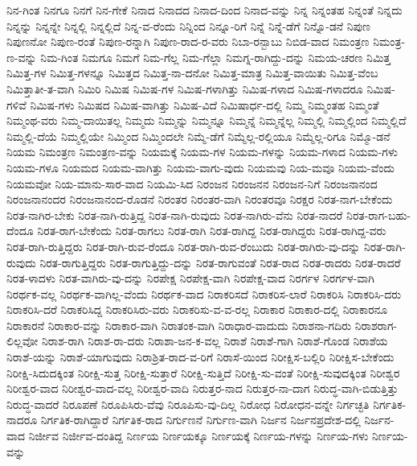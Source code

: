 {ನಿನ-ಗಿಂತ
ನಿನಗೂ
ನಿನಗೆ
ನಿನ-ಗೇಕೆ
ನಿನಾದ
ನಿನಾದದ
ನಿನಾದ-ದಿಂದ
ನಿನಾದ-ವನ್ನು
ನಿನ್ನ
ನಿನ್ನಂತಹ
ನಿನ್ನಂತೆ
ನಿನ್ನದು
ನಿನ್ನನ್ನು
ನಿನ್ನನ್ನೇ
ನಿನ್ನಲ್ಲಿ
ನಿನ್ನಲ್ಲಿದೆ
ನಿನ್ನ-ವ-ರೆಂದು
ನಿನ್ನಿಂದ
ನಿನ್ನೂ-ರಿಗೆ
ನಿನ್ನೆ
ನಿನ್ನೆ-ಡೆಗೆ
ನಿನ್ನೊ-ಡನೆ
ನಿಪುಣ
ನಿಪುಣನೋ
ನಿಪುಣ-ರಂತೆ
ನಿಪುಣ-ರನ್ನಾಗಿ
ನಿಪುಣ-ರಾದ-ರ-ವರು
ನಿಬಾ-ರನ್ಬಾಬು
ನಿಬಿಡ-ವಾದ
ನಿಮಂತ್ರಣ
ನಿಮಂತ್ರ-ಣ-ವನ್ನು
ನಿಮ-ಗಿಂತ
ನಿಮಗೂ
ನಿಮಗೆ
ನಿಮ-ಗೆಲ್ಲ
ನಿಮ-ಗೆಲ್ಲಾ
ನಿಮಗ್ನ-ರಾಗಿದ್ದು-ದನ್ನು
ನಿಮಯ-ಚರಣ
ನಿಮಿತ್ತ
ನಿಮಿತ್ತ-ಗಳ
ನಿಮಿತ್ತ-ಗಳನ್ನೂ
ನಿಮಿತ್ತದ
ನಿಮಿತ್ತ-ನಾ-ದನೋ
ನಿಮಿತ್ತ-ಮಾತ್ರ
ನಿಮಿತ್ತ-ವಾಯಿತು
ನಿಮಿತ್ತ-ವೆಂಬ
ನಿಮಿತ್ತಾತೀ-ತ-ವಾಗಿ
ನಿಮಿರಿ
ನಿಮಿಷ
ನಿಮಿಷ-ಗಳ
ನಿಮಿಷ-ಗಳಾಗಿತ್ತು
ನಿಮಿಷ-ಗಳಾದ
ನಿಮಿಷ-ಗಳಾದರೂ
ನಿಮಿಷ-ಗಳಿವೆ
ನಿಮಿಷ-ಗಳು
ನಿಮಿಷದ
ನಿಮಿಷ-ವಾಗಿತ್ತು
ನಿಮಿಷ-ವಿದೆ
ನಿಮಿಷಾರ್ಧ-ದಲ್ಲಿ
ನಿಮ್ಮ
ನಿಮ್ಮಂತಹ
ನಿಮ್ಮಂತೆ
ನಿಮ್ಮಂಥ-ವರು
ನಿಮ್ಮ-ದಾಯಿತಲ್ಲ
ನಿಮ್ಮದು
ನಿಮ್ಮನ್ನು
ನಿಮ್ಮನ್ನೂ
ನಿಮ್ಮನ್ನೆ
ನಿಮ್ಮನ್ನೆಲ್ಲ
ನಿಮ್ಮಲ್ಲಿ
ನಿಮ್ಮಲ್ಲಿಂದ
ನಿಮ್ಮಲ್ಲಿದೆ
ನಿಮ್ಮಲ್ಲಿ-ದೆಯೆ
ನಿಮ್ಮಲ್ಲಿಯೇ
ನಿಮ್ಮಿಂದ
ನಿಮ್ಮಿಂದಲೇ
ನಿಮ್ಮೆ-ಡೆಗೆ
ನಿಮ್ಮೆಲ್ಲ-ರಲ್ಲಿಯೂ
ನಿಮ್ಮೆಲ್ಲ-ರಿಗೂ
ನಿಮ್ಮೊ-ಡನೆ
ನಿಯಮ
ನಿಮಂತ್ರಣ
ನಿಮಂತ್ರಣ-ವನ್ನು
ನಿಯಮಕ್ಕೆ
ನಿಯಮ-ಗಳ
ನಿಯಮ-ಗಳನ್ನು
ನಿಯಮ-ಗಳಾದ
ನಿಯಮ-ಗಳು
ನಿಯಮ-ಗಳೂ
ನಿಯಮದ
ನಿಯಮ-ವಾಗಿತ್ತು
ನಿಯಮ-ವಾಗು-ವುದು
ನಿಯಮವು
ನಿಯ-ಮವೂ
ನಿಯಮ-ವೆಂದು
ನಿಯಮವೋ
ನಿಯ-ಮಾನು-ಸಾರ-ವಾದ
ನಿಯಮಿ-ಸಿದ
ನಿರಂಜನ
ನಿರಂಜನನ
ನಿರಂಜನ-ನಿಗೆ
ನಿರಂಜನಾನಂದ
ನಿರಂಜನಾನಂದರ
ನಿರಂಜನಾನಂದ-ರೊಡನೆ
ನಿರಂತರ
ನಿರಂತರ-ವಾಗಿ
ನಿರಂತರವೂ
ನಿರಕ್ಷರ
ನಿರತ-ನಾಗ-ಬೇಕೆಂದು
ನಿರತ-ನಾಗಿರ-ಬೇಕು
ನಿರತ-ನಾಗಿ-ರುತ್ತಿದ್ದ
ನಿರತ-ನಾಗಿ-ರುವುದು
ನಿರತ-ನಾಗಿರು-ವೆನು
ನಿರತ-ನಾದರೆ
ನಿರತ-ರಾಗ-ಬಹು-ದೆಂದೂ
ನಿರತ-ರಾಗ-ಬೇಕೆಂದು
ನಿರತ-ರಾಗಲು
ನಿರತ-ರಾಗಿ
ನಿರತ-ರಾಗಿದ್ದ
ನಿರತ-ರಾಗಿದ್ದರು
ನಿರತ-ರಾಗಿದ್ದ-ವರು
ನಿರತ-ರಾಗಿ-ರುತ್ತಿದ್ದರು
ನಿರತ-ರಾಗಿ-ರುವ-ರೆಂದೂ
ನಿರತ-ರಾಗಿ-ರುವ-ರೆಂಬುದು
ನಿರತ-ರಾಗಿರು-ವು-ದನ್ನು
ನಿರತ-ರಾಗಿ-ರುವುದು
ನಿರತ-ರಾಗುತ್ತಿದ್ದರು
ನಿರತ-ರಾಗುತ್ತಿದ್ದು-ದನ್ನು
ನಿರತ-ರಾಗುವಂತೆ
ನಿರತ-ರಾದ
ನಿರತ-ರಾದರು
ನಿರತ-ರಾದರೆ
ನಿರತ-ಳಾದಳು
ನಿರತ-ವಾಗಿರು-ವು-ದನ್ನು
ನಿರಪೇಕ್ಷ
ನಿರಪೇಕ್ಷ-ವಾಗಿ
ನಿರಪೇಕ್ಷ-ವಾದ
ನಿರರ್ಗಳ
ನಿರರ್ಗಳ-ವಾಗಿ
ನಿರರ್ಥಕ-ವಲ್ಲ
ನಿರರ್ಥಕ-ವಾಗಿಲ್ಲ-ವೆಂದು
ನಿರರ್ಥಕ-ವಾದ
ನಿರಾಕರಿಸದೆ
ನಿರಾಕರಿಸ-ಲಾರೆ
ನಿರಾಕರಿಸಿ
ನಿರಾಕರಿಸಿ-ದರು
ನಿರಾಕರಿಸಿ-ದರೆ
ನಿರಾಕರಿಸಿದ್ದ
ನಿರಾಕರಿಸಿರು-ವರು
ನಿರಾಕರಿಸು-ವ-ವ-ರಲ್ಲ
ನಿರಾಕಾರ
ನಿರಾಕಾರ-ದಲ್ಲಿ
ನಿರಾಕಾರನೂ
ನಿರಾಕಾರನೆ
ನಿರಾಕಾರ-ವನ್ನು
ನಿರಾಕಾರ-ವಾಗಿ
ನಿರಾತಂಕ-ವಾಗಿ
ನಿರಾಧಾರ-ವಾದುದು
ನಿರಾಶನಾ-ಗದಿರು
ನಿರಾಶರಾಗ-ಲಿಲ್ಲವೋ
ನಿರಾಶ-ರಾಗಿ
ನಿರಾಶ-ರಾ-ದರು
ನಿರಾಶಾ-ಜನ-ಕ-ವಲ್ಲ
ನಿರಾಶೆ
ನಿರಾಶೆ-ಗಾಗಿ
ನಿರಾಶೆ-ಗೊಂಡ
ನಿರಾಶೆಯ
ನಿರಾಶೆ-ಯನ್ನು
ನಿರಾಶೆ-ಯಾಗುವುದು
ನಿರಾಶ್ರಿತ-ರಾದ-ವ-ರಿಗೆ
ನಿರಾಸೆ-ಯಿಂದ
ನಿರೀಕ್ಷಿಸ-ಬಲ್ಲಿರಿ
ನಿರೀಕ್ಷಿಸ-ಬೇಕೆಂದು
ನಿರೀಕ್ಷಿ-ಸಿದುದಕ್ಕಿಂತ
ನಿರೀಕ್ಷಿ-ಸುತ್ತ
ನಿರೀಕ್ಷಿ-ಸುತ್ತಾರೆ
ನಿರೀಕ್ಷಿ-ಸುತ್ತಿದೆ
ನಿರೀಕ್ಷಿ-ಸು-ವಂತೆ
ನಿರೀಕ್ಷಿ-ಸುವುದಕ್ಕಿಂತ
ನಿರೀಶ್ವರ
ನಿರೀಶ್ವರ-ವಾದ
ನಿರೀಶ್ವರ-ವಾದ-ವಲ್ಲ
ನಿರೀಶ್ವರ-ವಾದಿ
ನಿರುತ್ತರ-ನಾದ
ನಿರುತ್ತರ-ನಾ-ದಾಗ
ನಿರುದ್ಧ-ವಾಗಿ-ಬಿಡುತ್ತಿತ್ತು
ನಿರುದ್ಧ-ವಾದರೆ
ನಿರೂಪಣೆ
ನಿರೂಪಿಸಿರು-ವೆವು
ನಿರೂಪಿಸು-ವು-ದಿಲ್ಲ
ನಿರೋಧ
ನಿರೋಧನ-ವನ್ನೇ
ನಿರ್ಗಚ್ಛತಿ
ನಿರ್ಗತಿಕ-ನಾದರೂ
ನಿರ್ಗತಿಕ-ರಾಗಿದ್ದಾರೆ
ನಿರ್ಗತಿಕ-ರಾದ
ನಿರ್ಗುಣನೆ
ನಿರ್ಗುಣ-ವಾಗಿ
ನಿರ್ಜನ
ನಿರ್ಜನಪ್ರದೇಶ-ದಲ್ಲಿ
ನಿರ್ಜನ-ವಾದ
ನಿರ್ಜೀವ
ನಿರ್ಜೀವ-ದಂತಿದ್ದ
ನಿರ್ಣಯ
ನಿರ್ಣಯಕ್ಕೂ
ನಿರ್ಣಯಕ್ಕೆ
ನಿರ್ಣಯ-ಗಳನ್ನು
ನಿರ್ಣಯ-ಗಳು
ನಿರ್ಣಯ-ವನ್ನು
}

